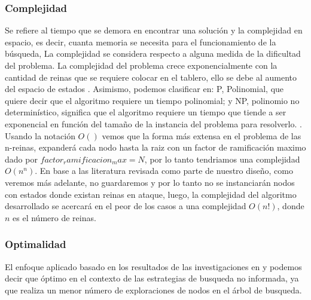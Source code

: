 \documentclass[conference]{IEEEtran}
\begin{document}
\subsubsection{Complejidad}\label{AA_10}
Se refiere al tiempo que se demora en encontrar una solución y la complejidad en espacio, es decir, cuanta memoria se necesita para el funcionamiento de la búsqueda, La complejidad se considera respecto a alguna medida de la dificultad del problema. La complejidad del problema crece exponencialmente con la cantidad de reinas que se requiere colocar en el tablero, ello se debe al aumento del espacio de estados \cite{r2}. Asimismo, podemos clasificar en: P, Polinomial, que quiere decir que el algoritmo requiere un tiempo polinomial; y NP, polinomio no determinístico, significa que el algoritmo requiere un tiempo que tiende a ser exponencial en función del tamaño de la instancia del problema para resolverlo. \cite{r2}. Usando la notación $O()$ vemos que la forma más extensa en el problema de las n-reinas, expanderá cada nodo hasta la raiz con un factor de ramificación maximo dado por $factor_ramificacion_max = N$, por lo tanto tendriamos una complejidad $O(n^n)$. En base a las literatura revisada \cite{r5_set_backtrack} como parte de nuestro diseño, como veremos más adelante, no guardaremos y por lo tanto no se instanciarán nodos con estados donde existan reinas en ataque, luego, la complejidad del algoritmo desarrollado se acercará en el peor de los casos a una complejidad $O(n!)$, donde $n$ es el número de reinas.

\subsubsection{Optimalidad}\label{AA_10}
El enfoque aplicado basado en los resultados de las investigaciones en \cite{r3_bfs_dfs} y \cite{r5_set_backtrack} podemos decir que óptimo en el contexto de las estrategias de busqueda no informada, ya que realiza un menor número de exploraciones de nodos en el árbol de busqueda.\\
\end{document}
